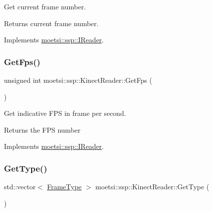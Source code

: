 Get current frame number. 

\begin{DoxyReturn}{Returns}
current frame number. 
\end{DoxyReturn}


Implements \hyperlink{classmoetsi_1_1ssp_1_1IReader_ac292d83eb06dee277baaa06e281a562d}{moetsi\+::ssp\+::\+I\+Reader}.

\mbox{\label{classmoetsi_1_1ssp_1_1KinectReader_ac88c13693ce8e2e249438ac8de8a7b3c}} 
\subsubsection{\texorpdfstring{Get\+Fps()}{GetFps()}}
{\footnotesize\ttfamily unsigned int moetsi\+::ssp\+::\+Kinect\+Reader\+::\+Get\+Fps (\begin{DoxyParamCaption}{ }\end{DoxyParamCaption})\hspace{0.3cm}{\ttfamily [virtual]}}



Get indicative F\+PS in frame per second. 

\begin{DoxyReturn}{Returns}
the F\+PS number 
\end{DoxyReturn}


Implements \hyperlink{classmoetsi_1_1ssp_1_1IReader_a9f6a8650ca290b011b8e5451eeae9f32}{moetsi\+::ssp\+::\+I\+Reader}.

\mbox{\label{classmoetsi_1_1ssp_1_1KinectReader_aef896aa686cbe1ea82dfc6aad46b6ff7}} 
\subsubsection{\texorpdfstring{Get\+Type()}{GetType()}}
{\footnotesize\ttfamily std\+::vector$<$ \hyperlink{namespacemoetsi_1_1ssp_a46efdfa2cd5a28ead465dcc8006b5a87}{Frame\+Type} $>$ moetsi\+::ssp\+::\+Kinect\+Reader\+::\+Get\+Type (\begin{DoxyParamCaption}{ }\end{DoxyParamCaption})\hspace{0.3cm}{\ttfamily [virtual]}}



